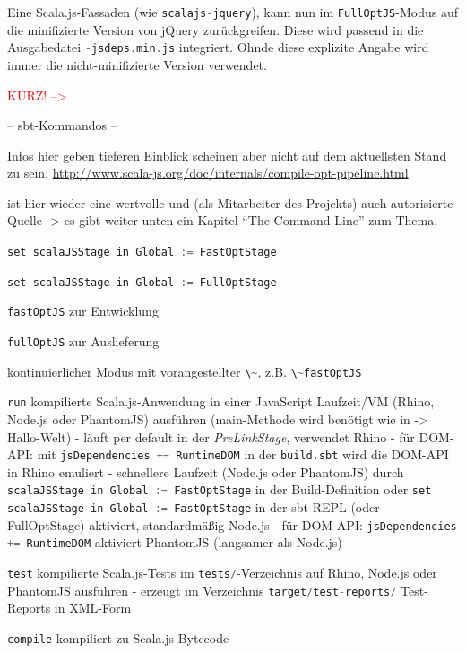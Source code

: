 \documentclass[a4paper, 12pt, hidelinks, listof=totoc, listoftables=totoc, bibliography=totoc]{scrreprt}
\newcommand{\code}[1]{\lstinline[language=Scala, style=inline]|#1|}
\newcommand{\TODO}[1]{\textcolor{red}{#1}\newline}
\begin{document}
Eine Scala.js-Fassaden (wie \code{scalajs-jquery}), kann nun im \code{FullOptJS}-Modus auf die minifizierte Version von jQuery zurückgreifen. Diese wird passend in die Ausgabedatei \code{-jsdeps.min.js} integriert. Ohnde diese explizite Angabe wird immer die nicht-minifizierte Version verwendet.








\TODO{KURZ!  --> }

-- sbt-Kommandos --

Infos hier geben tieferen Einblick scheinen aber nicht auf dem aktuellsten Stand zu sein.
\url{http://www.scala-js.org/doc/internals/compile-opt-pipeline.html}

\cite[\#TheCommandLine]{haoyi.HOS} ist hier wieder eine wertvolle und (als Mitarbeiter des Projekts) auch autorisierte Quelle -> es gibt weiter unten ein Kapitel "`The Command Line"' zum Thema.

\code{set scalaJSStage in Global := FastOptStage}

\code{set scalaJSStage in Global := FullOptStage}


\code{fastOptJS} zur Entwicklung

\code{fullOptJS} zur Auslieferung

kontinuierlicher Modus mit vorangestellter  \code{\~}, z.B. \code{\~fastOptJS}



\code{run} kompilierte Scala.js-Anwendung in einer JavaScript Laufzeit/VM (Rhino, Node.js oder PhantomJS) ausführen (main-Methode wird benötigt wie in -> Hallo-Welt)
	- läuft per default in der \emph{PreLinkStage}, verwendet Rhino
		- für \ac{DOM}-\ac{API}: mit \code{jsDependencies += RuntimeDOM} in der \code{build.sbt} wird die DOM-\ac{API} in Rhino emuliert
	- schnellere Laufzeit (Node.js oder PhantomJS) durch \code{scalaJSStage in Global := FastOptStage} in der Build-Definition oder \code{set scalaJSStage in Global := FastOptStage} in der sbt-\ac{REPL} (oder FullOptStage) aktiviert, standardmäßig Node.js
		- für \ac{DOM}-\ac{API}: \code{jsDependencies += RuntimeDOM} aktiviert PhantomJS (langsamer als Node.js)

\code{test} kompilierte Scala.js-Tests im \code{tests/}-Verzeichnis auf Rhino, Node.js oder PhantomJS ausführen
	- erzeugt im Verzeichnis \code{target/test-reports/} Test-Reports in \ac{XML}-Form

\code{compile} kompiliert zu Scala.js Bytecode
\end{document}
